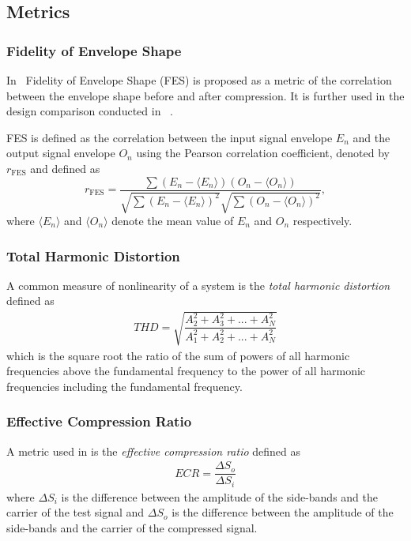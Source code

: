 \documentclass[../main2.tex]{subfiles}
\begin{document}
\subsection{Metrics}

\subsubsection{Fidelity of Envelope Shape} \label{fes}
In~\cite{stone2007quantifying} Fidelity of Envelope Shape (FES) is proposed as a metric of the correlation between the envelope shape before and after compression. It is further used in the design comparison conducted in ~\cite{reiss2012tutorial}.

FES is defined as the correlation between the input signal envelope $E_n$ and the output signal envelope $O_n$ using the Pearson correlation coefficient, denoted by $r_\text{FES}$ and defined as
\begin{equation}
r_\text{FES} = \dfrac{\sum(E_n - \langle E_n \rangle)(O_n - \langle O_n \rangle)}{\sqrt{\sum(E_n -\langle E_n \rangle )^2}\sqrt{\sum(O_n - \langle O_n \rangle )^2}},
\end{equation}
where $\langle E_n \rangle$ and $\langle O_n \rangle$ denote the mean value of $E_n$ and $O_n$ respectively.

\subsubsection{Total Harmonic Distortion}
A common measure of nonlinearity of a system is the \emph{total harmonic distortion} defined as \cite{dafx02}
\begin{align}
THD = \sqrt{\dfrac{A_2^2 + A_3^2 + ... + A_N^2}{A_1^2 + A_2^2 + ... + A_N^2}}
\end{align}
which is the square root the ratio of the sum of powers of all harmonic frequencies above the fundamental frequency to the power of all harmonic frequencies including the fundamental frequency.

\subsubsection{Effective Compression Ratio}
A metric used in \cite{reiss2012tutorial} is the \emph{effective compression ratio} defined as
\begin{align}
ECR = \dfrac{\Delta S_o}{\Delta S_i}
\end{align}
where $\Delta S_i$ is the difference between the amplitude of the side-bands and the carrier of the test signal and $\Delta S_o$ is the difference between the amplitude of the side-bands and the carrier of the compressed signal.
\end{document}
